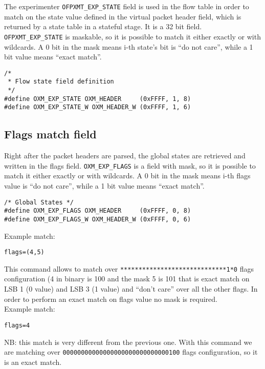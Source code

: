 The experimenter \texttt{OFPXMT\_EXP\_STATE} field is used in the flow table in order to match on the state value defined in the virtual packet header field, which is returned by a state table in a stateful stage. It is a 32 bit field.
\\
\texttt{OFPXMT\_EXP\_STATE} is maskable, so it is possible to match it either exactly or with wildcards. A 0 bit in the mask means i-th state's bit is ``do not care'', while a 1 bit value means ``exact match''.

\scriptsize\begin{verbatim}
/*
 * Flow state field definition
 */
#define OXM_EXP_STATE OXM_HEADER     (0xFFFF, 1, 8)
#define OXM_EXP_STATE_W OXM_HEADER_W (0xFFFF, 1, 6)
\end{verbatim}\normalsize

\subsection{Flags match field}
\label{section:oxm_of_flags}

Right after the packet headers are parsed, the global states are retrieved and written in the flags field. \texttt{OXM\_EXP\_FLAGS} is a field with mask, so it is possible to match it either exactly or with wildcards. A 0 bit in the mask means i-th flags value is ``do not care'', while a 1 bit value means ``exact match''.

\scriptsize\begin{verbatim}
/* Global States */
#define OXM_EXP_FLAGS OXM_HEADER     (0xFFFF, 0, 8)
#define OXM_EXP_FLAGS_W OXM_HEADER_W (0xFFFF, 0, 6) 
\end{verbatim}\normalsize
Example match:

\scriptsize\begin{verbatim}
flags=(4,5)
\end{verbatim}\normalsize
This command allows to match over \texttt{*****************************1*0} flags configuration (4 in binary is 100 and the mask 5 is 101 that is exact match on LSB 1 (0 value) and LSB 3 (1 value) and ``don’t care'' over all the other flags. In order to perform an exact match on flags value no mask is required.
\\
Example match:
\scriptsize\begin{verbatim}
flags=4
\end{verbatim}\normalsize
NB: this match is very different from the previous one. With this command we are matching over \texttt{00000000000000000000000000000100} flags configuration, so it is an exact match.


